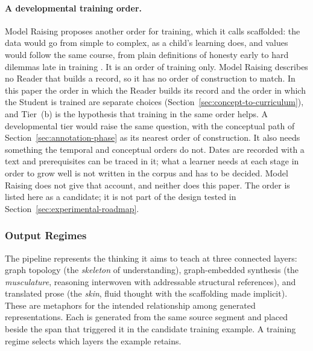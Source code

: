 \documentclass[11pt]{article}
\begin{document}
\paragraph{A developmental training order.}
Model Raising proposes another order for training, which it calls scaffolded:
the data would go from simple to complex, as a child's learning does, and
values would follow the same course, from plain definitions of honesty early to
hard dilemmas late in training \cite{aydin2026modelraising}. It is an order of
training only. Model Raising describes no Reader that builds a record, so it
has no order of construction to match. In this paper the order in which the
Reader builds its record and the order in which the Student is trained are
separate choices (Section~\ref{sec:concept-to-curriculum}), and Tier~(b) is the
hypothesis that training in the same order helps. A developmental tier would
raise the same question, with the conceptual path of
Section~\ref{sec:annotation-phase} as its nearest order of construction. It
also needs something the temporal and conceptual orders do not. Dates are
recorded with a text and prerequisites can be traced in it; what a learner
needs at each stage in order to grow well is not written in the corpus and has
to be decided. Model Raising does not give that account, and neither does this
paper. The order is listed here as a candidate; it is not part of the design
tested in Section~\ref{sec:experimental-roadmap}.

\subsubsection{Output Regimes}\label{sec:training-regimes}

The pipeline represents the thinking it aims to teach at three connected
layers: graph topology (the \emph{skeleton} of understanding), graph-embedded
synthesis (the \emph{musculature}, reasoning interwoven with addressable
structural references), and translated prose (the \emph{skin}, fluid thought
with the scaffolding made implicit). These are metaphors for the intended
relationship among generated representations. Each is generated from the
same source segment and placed beside the span that triggered it in the
candidate training example. A training regime selects which layers the example retains.
\end{document}
